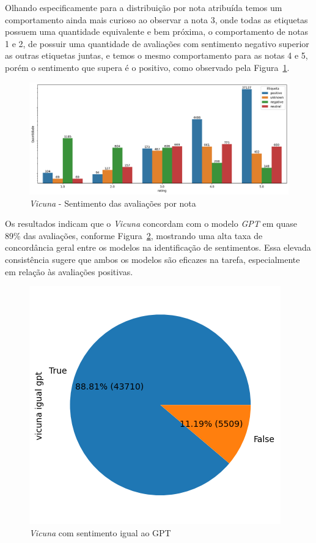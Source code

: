 Olhando especificamente para a distribuição por nota atribuída temos um comportamento ainda mais curioso ao observar a nota 3, onde todas as etiquetas possuem uma quantidade equivalente e bem próxima, o comportamento de notas 1 e 2, de possuir uma quantidade de avaliações com sentimento negativo superior as outras etiquetas juntas, e temos o mesmo comportamento para as notas 4 e 5, porém o sentimento que supera é o positivo, como observado pela Figura~\ref{img:vicuna_sentimento_nota}.

\begin{figure}
	\centering
	\includegraphics[width=1\textwidth]{figs/vicuna/sentimento_nota.png}
	\caption{\textit{Vicuna} - Sentimento das avaliações por nota}
	\label{img:vicuna_sentimento_nota}
\end{figure}

Os resultados indicam que o \textit{Vicuna} concordam com o modelo \textit{GPT} em quase 89\% das avaliações, conforme Figura~\ref{img:vicuna_vs_gpt}, mostrando uma alta taxa de concordância geral entre os modelos na identificação de sentimentos. Essa elevada consistência sugere que ambos os modelos são eficazes na tarefa, especialmente em relação às avaliações positivas.

\begin{figure}
	\centering
	\includegraphics{figs/vicuna/vs_gpt.png}
	\caption{\textit{Vicuna} com sentimento igual ao GPT}
	\label{img:vicuna_vs_gpt}
\end{figure}

